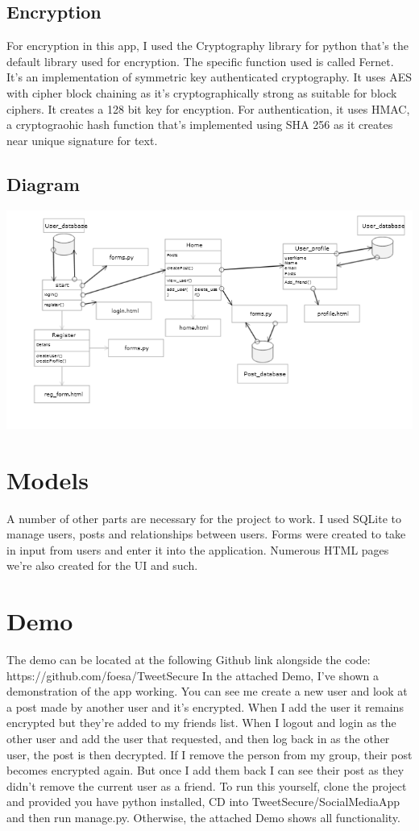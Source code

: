 \documentclass[11pt]{article} %
\begin{document}
\subsection{Encryption}
For encryption in this app, I used the Cryptography library for python that's the default library used for encryption. The specific function used is called Fernet. It's an implementation of symmetric key authenticated cryptography. It uses AES with cipher block chaining as it's cryptographically strong as suitable for block ciphers. It creates a 128 bit key for encyption. For authentication, it uses HMAC, a cryptograohic hash function that's implemented using SHA 256 as it creates near unique signature for text.
\subsection{Diagram}
\begin{center}
\includegraphics[scale = 0.9]{diagram.png}
\end{center}
\section{Models}
A number of other parts are necessary for the project to work. I used SQLite to manage users, posts and relationships between users. Forms were created to take in input from users and enter it into the application. Numerous HTML pages we're also created for the UI and such.
\section{Demo}
The demo can be located at the following Github link alongside the code: 
\newline
https://github.com/foesa/TweetSecure
\newline
In the attached Demo, I've shown a demonstration of the app working. You can see me create a new user and look at a post made by another user and it's encrypted. When I add the user it remains encrypted but they're added to my friends list. When I logout and login as the other user and add the user that requested, and then log back in as the other user, the post is then decrypted. If I remove the person from my group, their post becomes encrypted again. But once I add them back I can see their post as they didn't remove the current user as a friend. 
\newline
To run this yourself, clone the project and provided you have python installed, CD into TweetSecure/SocialMediaApp and then run manage.py. Otherwise, the attached Demo shows all functionality.
\end{document}
